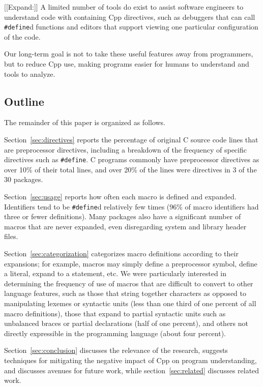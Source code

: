 \documentclass[11pt]{article}
\def\numpackages{30}
\begin{document}

[[Expand:]]
A limited number of tools do exist to assist software engineers to
understand code with containing Cpp directives, such as debuggers that can
call {\tt \#define}d functions and editors that support viewing one
particular configuration of the code.

Our long-term goal is not to take these useful features away from
programmers, but to reduce Cpp use, making programs easier for humans to
understand and tools to analyze.


\subsection{Outline}

The remainder of this paper is organized as follows.

Section~\ref{sec:directives} reports the percentage of original C source
code lines that are preprocessor directives, including a breakdown of the
frequency of specific directives such as {\tt \#define}.  C programs
commonly have preprocessor directives as over 10\% of their total lines,
and over 20\% of the lines were directives in 3 of the {\numpackages}
packages.

Section~\ref{sec:usage} reports how often each macro is defined and
expanded.   Identifiers tend to be {\tt \#define}d relatively few times
(96\% of macro identifiers had three or fewer definitions).  Many packages
also have a significant number of macros that are never expanded, even
disregarding system and library header files.

Section~\ref{sec:categorization} categorizes macro definitions according to
their expansions; for example, macros may simply define a preprocessor
symbol, define a literal, expand to a statement, etc.  We were particularly
interested in determining the frequency of use of macros that are difficult
to convert to other language features, such as those that string together
characters as opposed to manipulating lexemes or syntactic units (less than
one third of one percent of all macro definitions),
those that expand to partial syntactic units such as unbalanced
braces or partial declarations (half of one percent), and others not 
directly expressible in the programming language (about four percent).

Section~\ref{sec:conclusion} discusses the relevance of the research,
suggests techniques for mitigating the negative impact of Cpp on program
understanding, and discusses avenues for future work, while
section~\ref{sec:related} discusses related work.
\end{document}
